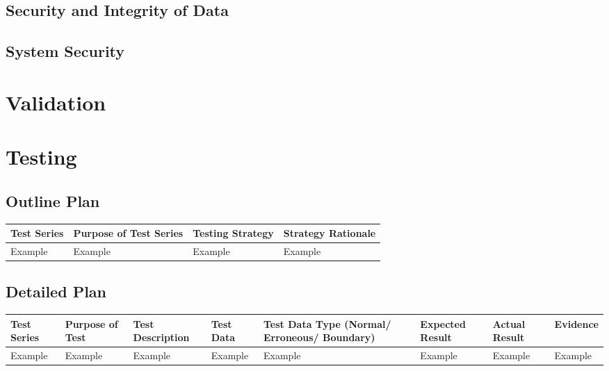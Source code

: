 \subsection{Security and Integrity of Data}

\subsection{System Security}

\section{Validation}

\section{Testing}

\begin{landscape}
\subsection{Outline Plan}

\begin{center}
    \begin{tabular}{|p{2cm}|p{5cm}|p{5cm}|p{4cm}|}
        \hline
        \textbf{Test Series} & \textbf{Purpose of Test Series} & \textbf{Testing Strategy} & \textbf{Strategy Rationale}\\ \hline
        Example & Example & Example & Example \\ \hline
    \end{tabular}
\end{center}

\subsection{Detailed Plan}

\begin{center}
    \begin{longtable}{|p{1.5cm}|p{2.5cm}|p{2.5cm}|p{2cm}|p{2cm}|p{2cm}|p{2cm}|p{2cm}|}
        \hline
        \textbf{Test Series} & \textbf{Purpose of Test} & \textbf{Test Description} & \textbf{Test Data} & \textbf{Test Data Type (Normal/ Erroneous/ Boundary)} & \textbf{Expected Result} & \textbf{Actual Result} & \textbf{Evidence}\\ \hline
        Example & Example & Example & Example & Example & Example & Example & Example \\ \hline
    \end{longtable}
\end{center}
\end{landscape}